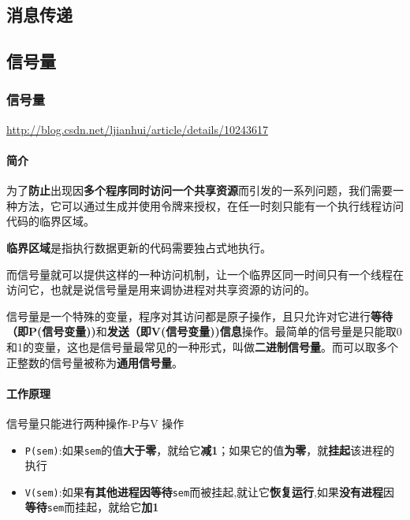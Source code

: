 \documentclass[UTF8,a4paper,12pt]{ctexbook}
\begin{document}
		\subsection{消息传递}
		
		\subsection{信号量}
			\subsubsection{信号量}
				\url{http://blog.csdn.net/ljianhui/article/details/10243617}
				\paragraph{简介}
					为了\textbf{防止}出现因\textbf{多个程序同时访问一个共享资源}而引发的一系列问题，我们需要一种方法，它可以通过生成并使用令牌来授权，在任一时刻只能有一个执行线程访问代码的临界区域。
					
					\textbf{临界区域}是指执行数据更新的代码需要独占式地执行。
					
					而信号量就可以提供这样的一种访问机制，让一个临界区同一时间只有一个线程在访问它，也就是说信号量是用来调协进程对共享资源的访问的。
					
					信号量是一个特殊的变量，程序对其访问都是原子操作，且只允许对它进行\textbf{等待（即P(信号变量))}和\textbf{发送（即V(信号变量))信息}操作。最简单的信号量是只能取0和1的变量，这也是信号量最常见的一种形式，叫做\textbf{二进制信号量}。而可以取多个正整数的信号量被称为\textbf{通用信号量}。
					
				\paragraph{工作原理}
					信号量只能进行两种操作-P与V 操作
						\begin{itemize}
							\item \verb|P(sem)|:如果\verb|sem|的值\textbf{大于零}，就给它\textbf{减1}；如果它的值\textbf{为零}，就\textbf{挂起}该进程的执行
							\item \verb|V(sem)|:如果\textbf{有其他进程因等待}\verb|sem|而被挂起,就让它\textbf{恢复运行},如果\textbf{没有进程}因\textbf{等待}\verb|sem|而挂起，就给它\textbf{加1}
						\end{itemize}
				
\end{document}
